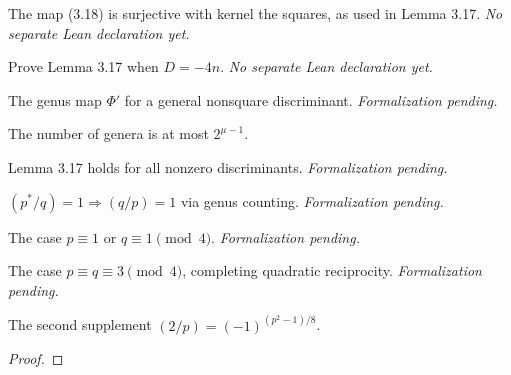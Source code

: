 \begin{theorem}[Exercise 3.11(a)]
  \label{exr:s3_11_a}
  \notready
  The map (3.18) is surjective with kernel the squares, as used in Lemma 3.17.
  \emph{No separate Lean declaration yet.}
\end{theorem}

\begin{theorem}[Exercise 3.11(b)]
  \label{exr:s3_11_b}
  \notready
  Prove Lemma 3.17 when $D=-4n$. \emph{No separate Lean declaration yet.}
\end{theorem}

\begin{theorem}[Exercise 3.12(a)]
  \label{exr:s3_12_a}
  \notready
  The genus map $\Phi'$ for a general nonsquare discriminant. \emph{Formalization pending.}
\end{theorem}

\begin{theorem}[Exercise 3.12(b)]
  \label{exr:s3_12_b}
  \leanok
  The number of genera is at most $2^{\mu-1}$.
\end{theorem}

\begin{theorem}[Exercise 3.13(a)]
  \label{exr:s3_13_a}
  \notready
  Lemma 3.17 holds for all nonzero discriminants. \emph{Formalization pending.}
\end{theorem}

\begin{theorem}[Exercise 3.13(b)]
  \label{exr:s3_13_b}
  \notready
  $(p^*/q)=1 \Rightarrow (q/p)=1$ via genus counting. \emph{Formalization pending.}
\end{theorem}

\begin{theorem}[Exercise 3.13(c)]
  \label{exr:s3_13_c}
  \notready
  The case $p\equiv1$ or $q\equiv1 \pmod 4$. \emph{Formalization pending.}
\end{theorem}

\begin{theorem}[Exercise 3.13(d)]
  \label{exr:s3_13_d}
  \notready
  The case $p\equiv q\equiv3 \pmod 4$, completing quadratic reciprocity.
  \emph{Formalization pending.}
\end{theorem}

\begin{theorem}[Exercise 3.13(e)]
  \label{exr:s3_13_e}
  \leanok
  The second supplement $(2/p)=(-1)^{(p^2-1)/8}$.
\end{theorem}
\begin{proof}\leanok\end{proof}

